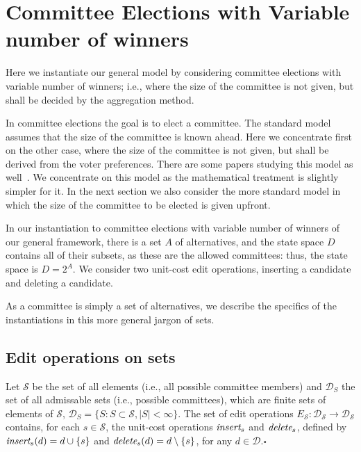\documentclass[sigconf]{aamas}  %
\newcommand{\qqed}{\hfill$\square$}
\newcommand{\calD}{\mathcal{D}}
\newcommand{\calS}{\mathcal{S}}
\newcommand{\iinsert}[1]{\emph{insert}_{#1}}
\newcommand{\ddelete}[1]{\emph{delete}_{#1}}
\begin{document}
\section{Committee Elections with Variable number of winners}
\label{section:commiteee election}

Here we instantiate our general model by considering committee elections with variable number of winners; i.e., where the size of the committee is not given, but shall be decided by the aggregation method.

In committee elections the goal is to elect a committee. The standard model assumes that the size of the committee is known ahead.
Here we concentrate first on the other case, where the size of the committee is not given, but shall be derived from the voter preferences. There are some papers studying this model as well~\cite{kilgourvnw,vnw}.
We concentrate on this model as the mathematical treatment is slightly simpler for it. In the next section we also consider the more standard model in which the size of the committee to be elected is given upfront.

In our instantiation to committee elections with variable number of winners of our general framework, there is a set $A$ of alternatives, and the state space $D$ contains all of their subsets, as these are the allowed committees:
  thus, the state space is $D = 2^A$.
We consider two unit-cost edit operations, inserting a candidate and deleting a candidate.

As a committee is simply a set of alternatives, we describe the specifics of the instantiations in this more general jargon of sets.


\subsection{Edit operations on sets}

\begin{definition}
Let $\calS$ be the set of all elements (i.e., all possible committee members) and $\calD_S$ the set of all admissable sets (i.e., possible committees), which are finite sets of elements of $\calS$,   $\calD_S = \{S: S \subset \calS, |S| < \infty\}$. The set of edit operations $E_\calS: \calD_\calS \rightarrow \calD_\calS$ contains, for each $s \in \calS$, the unit-cost operations $\iinsert{s}$ and $\ddelete{s}$, defined by
$\iinsert{s}(d) = d \cup \{s\}$ and $\ddelete{s}(d) = d \setminus \{s\}$, for any $d \in \calD$.\qqed
\end{definition}
\end{document}

